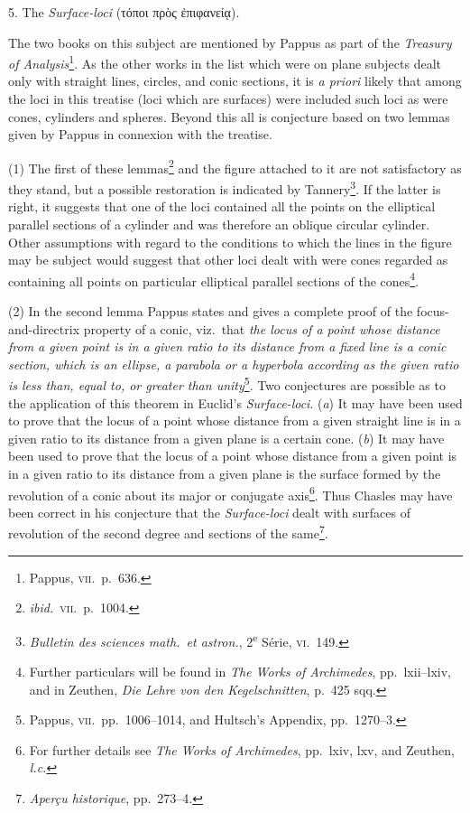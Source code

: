 5. The \emph{Surface-loci} (τόποι πρὸς ἐπιφανείᾳ).

The two books on this subject are mentioned by Pappus as part of the \emph{Treasury of Analysis}\footnote{Pappus, \textsc{vii.}\ p.~636.}. As the other works in the list which were on plane subjects dealt only with straight lines, circles, and conic sections, it is \emph{a priori} likely that among the loci in this treatise (loci which are surfaces) were included such loci as were cones, cylinders and spheres. Beyond this all is conjecture based on two lemmas given by Pappus in connexion with the treatise.

(1) The first of these lemmas\footnote{\emph{ibid.}\ \textsc{vii.}\ p.~1004.} and the figure attached to it are not satisfactory as they stand, but a possible restoration is indicated by Tannery\footnote{\emph{Bulletin des sciences math.\ et astron.}, 2\textsuperscript{e} Série, \textsc{vi.}\ 149.}. If the latter is right, it suggests that one of the loci contained all the points on the elliptical parallel sections of a cylinder and was therefore an oblique circular cylinder. Other assumptions with regard to the conditions to which the lines in the figure may be subject would suggest that other loci dealt with were cones regarded as containing all points on particular elliptical parallel sections of the cones\footnote{Further particulars will be found in \emph{The Works of Archimedes}, pp.~lxii--lxiv, and in Zeuthen, \emph{Die Lehre von den Kegelschnitten}, p.~425 sqq.}.

(2) In the second lemma Pappus states and gives a complete proof of the focus-and-directrix property of a conic, viz.\ that \emph{the locus of a point whose distance from a given point is in a given ratio to its distance from a fixed line is a conic section, which is an ellipse, a parabola or a hyperbola according as the given ratio is less than, equal to, or greater than unity}\footnote{Pappus, \textsc{vii.}\ pp.~1006--1014, and Hultsch's Appendix, pp.~1270--3.}. Two conjectures are possible as to the application of this theorem in Euclid's \emph{Surface-loci}. (\emph{a}) It may have been used to prove that the locus of a point whose distance from a given straight line is in a given ratio to its distance from a given plane is a certain cone. (\emph{b}) It may have been used to prove that the locus of a point whose distance from a given point is in a given ratio to its distance from a given plane is the surface formed by the revolution of a conic about its major or conjugate axis\footnote{For further details see \emph{The Works of Archimedes}, pp.~lxiv, lxv, and Zeuthen, \emph{l.c.}}. Thus Chasles may have been correct in his conjecture that the \emph{Surface-loci} dealt with surfaces of revolution of the second degree and sections of the same\footnote{\emph{Aperçu historique}, pp.~273--4.}.

